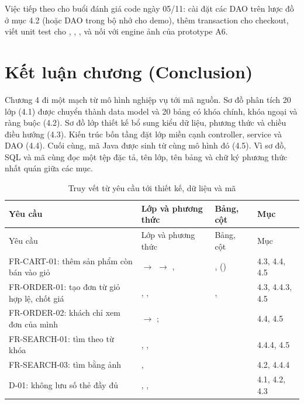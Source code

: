 \documentclass[12pt,a4paper]{article}
\begin{document}
Việc tiếp theo cho buổi đánh giá code ngày 05/11: cài đặt các DAO trên lược đồ ở mục 4.2 (hoặc DAO
trong bộ nhớ cho demo), thêm transaction cho checkout, viết unit test cho , ,
, và nối  với engine ảnh của prototype A6.

\section{Kết luận chương (Conclusion)}\label{sec:46}

Chương 4 đi một mạch từ mô hình nghiệp vụ tới mã nguồn. Sơ đồ phân tích 20 lớp (4.1) được chuyển thành
data model và 20 bảng có khóa chính, khóa ngoại và ràng buộc (4.2). Sơ đồ lớp thiết kế bổ sung kiểu dữ
liệu, phương thức và chiều điều hướng (4.3). Kiến trúc bốn tầng đặt lớp miền cạnh controller, service và
DAO (4.4). Cuối cùng, mã Java được sinh từ cùng mô hình đó (4.5). Vì sơ đồ, SQL và mã cùng đọc một tệp
đặc tả, tên lớp, tên bảng và chữ ký phương thức nhất quán giữa các mục.

\begin{longtable}{@{}P{2.9cm}P{6.3cm}P{3.5cm}P{2.8cm}@{}}
\caption{Truy vết từ yêu cầu tới thiết kế, dữ liệu và mã}\label{tab:trace}\\
\toprule
Yêu cầu & Lớp và phương thức & Bảng, cột & Mục\\
\midrule
\endfirsthead
\toprule
Yêu cầu & Lớp và phương thức & Bảng, cột & Mục\\
\midrule
\endhead
\small FR-CART-01: thêm sản phẩm còn bán vào giỏ & \small{} $\to$  $\to$ ,  & \small{},  () & \small 4.3, 4.4, 4.5\\
\small FR-ORDER-01: tạo đơn từ giỏ hợp lệ, chốt giá & \small{}, ,  & \small{},  & \small 4.3, 4.4.3, 4.5\\
\small FR-ORDER-02: khách chỉ xem đơn của mình & \small{} $\to$ ;  & \small{} & \small 4.4, 4.5\\
\small FR-SEARCH-01: tìm theo từ khóa & \small{}, ,  & \small{} & \small 4.4.4, 4.5\\
\small FR-SEARCH-03: tìm bằng ảnh & \small{},  & \small{} & \small 4.2, 4.4.4\\
\small D-01: không lưu số thẻ đầy đủ & \small{}, ,  & \small{} & \small 4.1, 4.2, 4.3\\
\bottomrule
\end{longtable}
\end{document}
